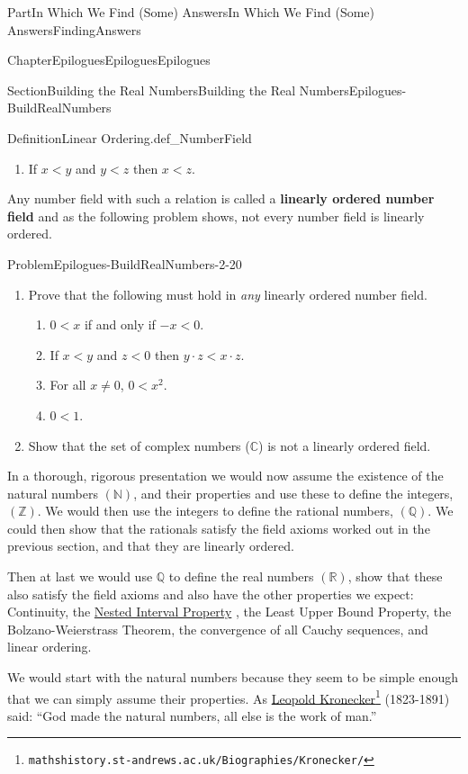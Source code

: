 \documentclass[oneside,10pt,]{book}
\newcommand{\terminology}[1]{\textbf{#1}}
\numberwithin{equation}{part}
\newcommand{\CC}{\mathbb {C}}
\newcommand{\RR}{\mathbb {R}}
\newcommand{\QQ}{\mathbb {Q}}
\newcommand{\NN}{\mathbb {N}}
\newcommand{\ZZ}{\mathbb {Z}}
\newcommand{\lt}{<}
\begin{document}
\begin{partptx}{Part}{In Which We Find (Some) Answers}{}{In Which We Find (Some) Answers}{}{}{FindingAnswers}
\begin{chapterptx}{Chapter}{Epilogues}{}{Epilogues}{}{}{Epilogues}
\begin{sectionptx}{Section}{Building the Real Numbers}{}{Building the Real Numbers}{}{}{Epilogues-BuildRealNumbers}
\begin{introduction}{}
\begin{definition}{Definition}{Linear Ordering.}{def_NumberField}
\begin{enumerate}
\item{}If \(x\lt y\) and \(y\lt z\) then \(x\lt z\).%
\end{enumerate}
%
\end{definition}
Any number field with such a relation is called a \terminology{linearly ordered number field} and as the following problem shows, not every number field is linearly ordered.%
\begin{problem}{Problem}{}{Epilogues-BuildRealNumbers-2-20}%
\begin{enumerate}[font=\bfseries,label=(\alph*),ref=\alph*]%
\item{}Prove that the following must hold in \emph{any} linearly ordered number field.%
\par
%
\begin{enumerate}
\item{}\(0\lt x\) if and only if \(-x\lt 0\).%
\item{}If \(x\lt y\) and \(z\lt 0\) then \(y\cdot z\lt x\cdot z\).%
\item{}For all \(x\neq 0\), \(0\lt x^2\).%
\item{}\(0\lt 1\).%
\end{enumerate}
%
\item{}Show that the set of complex numbers (\(\CC\)) is not a linearly ordered field.%
\end{enumerate}%
\end{problem}
In a thorough, rigorous presentation we would now assume the existence of the natural numbers \((\NN)\), and their properties and use these to define the integers, \((\ZZ)\).  We would then use the integers to define the rational numbers, \((\QQ)\).  We could then show that the rationals satisfy the field axioms worked out in the previous section, and that they are linearly ordered.%
\par
Then \textemdash{} at last \textemdash{} we would use \(\QQ\) to define the real numbers \((\RR)\), show that these also satisfy the field axioms and also have the other properties we expect: Continuity, the \hyperref[NIP]{Nested Interval Property} , the Least Upper Bound Property, the Bolzano-Weierstrass Theorem, the convergence of all Cauchy sequences, and linear ordering.%
\par
We would start with the natural numbers because they seem to be simple enough that we can simply assume their properties. As \href{https://mathshistory.st-andrews.ac.uk/Biographies/Kronecker/}{Leopold Kronecker}\footnote{\nolinkurl{mathshistory.st-andrews.ac.uk/Biographies/Kronecker/}\label{Epilogues-BuildRealNumbers-2-23-2}} (1823-1891) said: ``God made the natural numbers, all else is the work of man.''%

\end{introduction}
\end{sectionptx}
\end{chapterptx}
\end{partptx}
\end{document}
